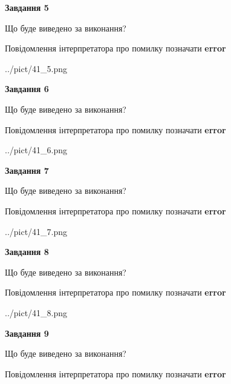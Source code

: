 \documentclass[11pt, ukrainian]{article}
\begin{document}
{\begin {large}
{\begin {center}\textbf{Завдання 5}\end {center}}\par
Що буде виведено за виконання? \par
Повідомлення інтерпретатора про помилку позначати \textbf{error}

\begin{center}
	{../pict/41_5.png}
\end{center}
\newpage

{\begin {center}\textbf{Завдання 6}\end {center}}\par
Що буде виведено за виконання? \par
Повідомлення інтерпретатора про помилку позначати \textbf{error}

\begin{center}
	{../pict/41_6.png}
\end{center}
\newpage

{\begin {center}\textbf{Завдання 7}\end {center}}\par
Що буде виведено за виконання? \par
Повідомлення інтерпретатора про помилку позначати \textbf{error}

\begin{center}
	{../pict/41_7.png}
\end{center}
\newpage

{\begin {center}\textbf{Завдання 8}\end {center}}\par
Що буде виведено за виконання? \par
Повідомлення інтерпретатора про помилку позначати \textbf{error}

\begin{center}
	{../pict/41_8.png}
\end{center}
\newpage

{\begin {center}\textbf{Завдання 9}\end {center}}\par
Що буде виведено за виконання? \par
Повідомлення інтерпретатора про помилку позначати \textbf{error}


\end{large}}
\end{document}
